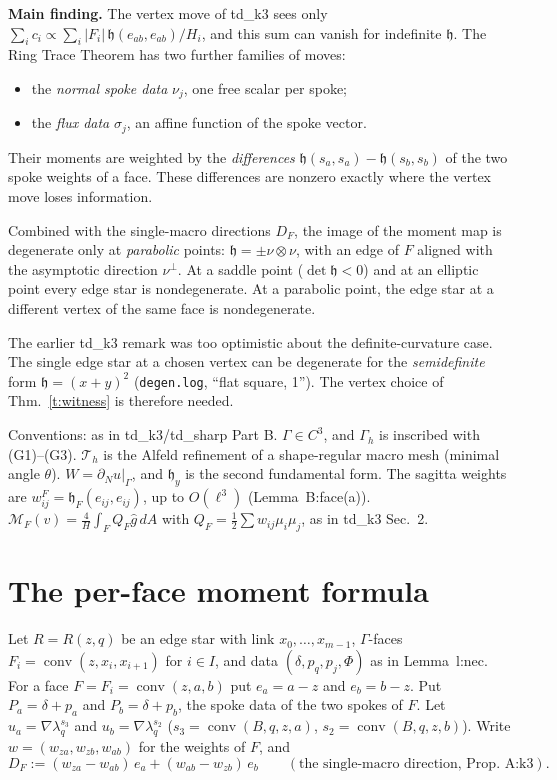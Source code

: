 \documentclass[11pt]{article}
\theoremstyle{definition}
\newcommand{\Gh}{\Gamma_h}
\newcommand{\M}{\mathcal M}
\newcommand{\gh}{\hat g}
\newcommand{\hh}{\mathfrak h}
\DeclareMathOperator{\conv}{conv}
\newcommand{\Th}{\mathcal T_h}
\begin{document}
\noindent\textbf{Main finding.} The vertex move of td\_k3 sees only $\sum_i c_i\propto\sum_i|F_i|\,\hh(e_{ab},e_{ab})/H_i$, and this sum can vanish for indefinite $\hh$. The Ring Trace Theorem has two further families of moves:
\begin{itemize}[leftmargin=1.2em]
\item the \emph{normal spoke data} $\nu_j$, one free scalar per spoke;
\item the \emph{flux data} $\sigma_j$, an affine function of the spoke vector.
\end{itemize}
Their moments are weighted by the \emph{differences} $\hh(s_a,s_a)-\hh(s_b,s_b)$ of the two spoke weights of a face. These differences are nonzero exactly where the vertex move loses information.

Combined with the single-macro directions $D_F$, the image of the moment map is degenerate only at \emph{parabolic} points: $\hh=\pm\nu\otimes\nu$, with an edge of $F$ aligned with the asymptotic direction $\nu^\perp$. At a saddle point ($\det\hh<0$) and at an elliptic point every edge star is nondegenerate. At a parabolic point, the edge star at a different vertex of the same face is nondegenerate.

The earlier td\_k3 remark was too optimistic about the definite-curvature case. The single edge star at a chosen vertex can be degenerate for the \emph{semidefinite} form $\hh=(x+y)^2$ (\texttt{degen.log}, ``flat square, 1''). The vertex choice of Thm.~\ref{t:witness} is therefore needed.

Conventions: as in td\_k3/td\_sharp Part B. $\Gamma\in C^3$, and $\Gh$ is inscribed with (G1)--(G3). $\Th$ is the Alfeld refinement of a shape-regular macro mesh (minimal angle $\theta$). $W=\partial_Nu|_\Gamma$, and $\hh_y$ is the second fundamental form. The sagitta weights are $w^F_{ij}=\hh_F(e_{ij},e_{ij})$, up to $O(\ell^3)$ (Lemma~B:face(a)). $\M_F(v)=\frac4H\int_FQ_F\gh\,dA$ with $Q_F=\frac12\sum w_{ij}\mu_i\mu_j$, as in td\_k3 Sec.~2.

\section{The per-face moment formula}\label{s:face}
Let $R=R(z,q)$ be an edge star with link $x_0,\dots,x_{m-1}$, $\Gamma$-faces $F_i=\conv(z,x_i,x_{i+1})$ for $i\in I$, and data $(\delta,p_q,p_j,\Phi)$ as in Lemma~l:nec. For a face $F=F_i=\conv(z,a,b)$ put $e_a=a-z$ and $e_b=b-z$. Put $P_a=\delta+p_a$ and $P_b=\delta+p_b$, the spoke data of the two spokes of $F$. Let $u_a=\nabla\lambda_q^{s_3}$ and $u_b=\nabla\lambda_q^{s_2}$ ($s_3=\conv(B,q,z,a)$, $s_2=\conv(B,q,z,b)$). Write $w=(w_{za},w_{zb},w_{ab})$ for the weights of $F$, and
\[
D_F:=(w_{za}-w_{ab})\,e_a+(w_{ab}-w_{zb})\,e_b\qquad(\text{the single-macro direction, Prop.~A:k3}).
\]
\end{document}
